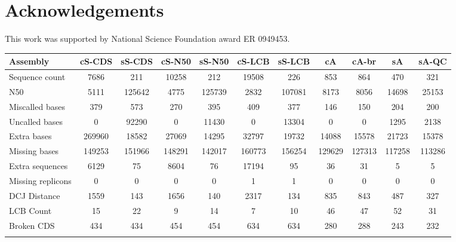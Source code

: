 \documentclass{bioinfo}
\begin{document}
\section*{Acknowledgements}
This work was supported by National Science Foundation award ER 0949453.






\begin{table}[!t] 
{\begin{tabular}{l|cccccccccc}\toprule
Assembly           & cS-CDS & sS-CDS & cS-N50 & sS-N50 & cS-LCB & sS-LCB & cA     & cA-br  & sA     & sA-QC   \\\midrule
Sequence count     & 7686   & 211    & 10258  & 212    & 19508  & 226    & 853    & 864    & 470    & 321     \\
N50                & 5111   & 125642 & 4775   & 125739 & 2832   & 107081 & 8173   & 8056   & 14698  & 25153   \\
Miscalled bases    & 379    & 573    & 270    & 395    & 409    & 377    & 146    & 150    & 204    & 200     \\
Uncalled bases     & 0      & 92290  & 0      & 11430  & 0      & 13304  & 0      & 0      & 1295   & 2138    \\
Extra bases        & 269960 & 18582  & 27069  & 14295  & 32797  & 19732  & 14088  & 15578  & 21723  & 15378   \\
Missing bases      & 149253 & 151966 & 148291 & 142017 & 160773 & 156254 & 129629 & 127313 & 117258 & 113286  \\
Extra sequences    & 6129   & 75     & 8604   & 76     & 17194  & 95     & 36     & 31     & 5      & 5       \\
Missing replicons  & 0      & 0      & 0      & 0      & 1      & 1      & 0      & 0      & 0      & 0       \\
DCJ Distance       & 1559   & 143    & 1656   & 140    & 2317   & 134    & 835    & 843    & 487    & 327     \\
LCB Count          & 15     & 22     & 9      & 14     & 7      & 10     & 46     & 47     & 52     & 31      \\
Broken CDS         & 434    & 434    & 454    &	454    & 634    & 634    & 280    & 288    & 243    & 232     \\
\botrule \\
\end{tabular}}{}
\end{table}
\end{document}
